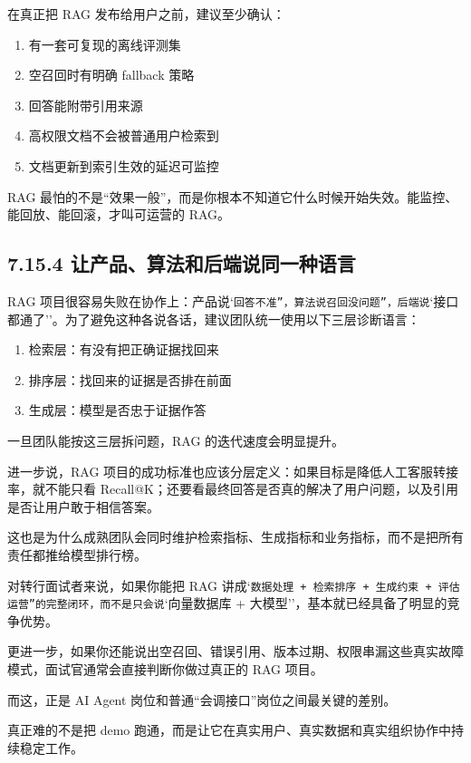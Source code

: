 在真正把 RAG 发布给用户之前，建议至少确认：


\begin{enumerate}[leftmargin=2em]
\item 有一套可复现的离线评测集
\item 空召回时有明确 fallback 策略
\item 回答能附带引用来源
\item 高权限文档不会被普通用户检索到
\item 文档更新到索引生效的延迟可监控
\end{enumerate}

RAG 最怕的不是``效果一般''，而是你根本不知道它什么时候开始失效。能监控、能回放、能回滚，才叫可运营的 RAG。


\subsection{7.15.4 让产品、算法和后端说同一种语言}

RAG 项目很容易失败在协作上：产品说`\texttt{回答不准''，算法说}\texttt{召回没问题''，后端说}`接口都通了''。为了避免这种各说各话，建议团队统一使用以下三层诊断语言：


\begin{enumerate}[leftmargin=2em]
\item 检索层：有没有把正确证据找回来
\item 排序层：找回来的证据是否排在前面
\item 生成层：模型是否忠于证据作答
\end{enumerate}

一旦团队能按这三层拆问题，RAG 的迭代速度会明显提升。

进一步说，RAG 项目的成功标准也应该分层定义：如果目标是降低人工客服转接率，就不能只看 Recall@K；还要看最终回答是否真的解决了用户问题，以及引用是否让用户敢于相信答案。

这也是为什么成熟团队会同时维护检索指标、生成指标和业务指标，而不是把所有责任都推给模型排行榜。

对转行面试者来说，如果你能把 RAG 讲成`\texttt{数据处理 + 检索排序 + 生成约束 + 评估运营''的完整闭环，而不是只会说}`向量数据库 + 大模型''，基本就已经具备了明显的竞争优势。

更进一步，如果你还能说出空召回、错误引用、版本过期、权限串漏这些真实故障模式，面试官通常会直接判断你做过真正的 RAG 项目。

而这，正是 AI Agent 岗位和普通``会调接口''岗位之间最关键的差别。

真正难的不是把 demo 跑通，而是让它在真实用户、真实数据和真实组织协作中持续稳定工作。

